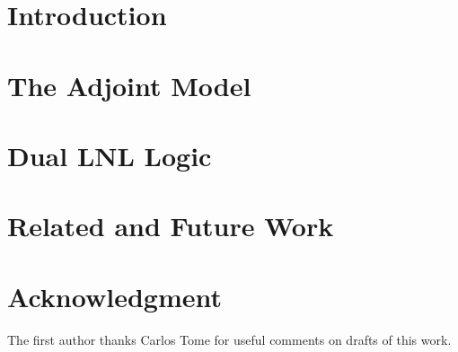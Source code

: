 \documentclass{lmcs}
\begin{document}
\section{Introduction}
\label{sec:introduction}


\section{The Adjoint Model}
\label{sec:adjoint_model}


\section{Dual LNL Logic}
\label{sec:dual_lnl_logic}


\section{Related and Future Work}
\label{sec:related_work}


\section*{Acknowledgment}

The first author thanks Carlos Tome for useful comments on drafts of this work.

 

\appendix

\end{document}
